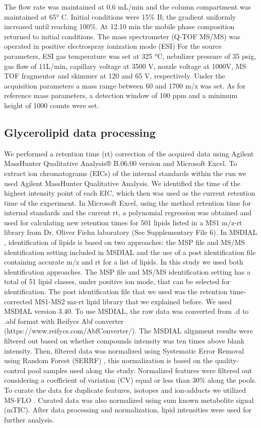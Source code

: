 \documentclass[9pt,twocolumn,twoside]{BioRxiv}
\begin{document}
The flow rate was maintained at 0.6 mL/min and the column compartment was maintained at 65° C. Initial conditions were 15\% B; the gradient uniformly increased until reaching 100\%. 
At 12.10 min the mobile phase composition returned to initial conditions.
The mass spectrometer (Q-TOF MS/MS) was operated in positive electrospray ionization mode (ESI)
For the source parameters, ESI gas temperature was set at 325 °C, nebulizer pressure of 35 psig, gas flow of 11L/min, capillary voltage at 3500 V, nozzle voltage at 1000V, MS TOF fragmentor and skimmer at 120 and 65 V, respectively.
Under the acquisition parameters a mass range between 60 and 1700 m/z was set. As for reference mass parameters, a detection window of 100 ppm and a minimum height of 1000 counts were set. 

\subsection{Glycerolipid data processing}
We performed a retention time (rt) correction of the acquired data using Agilent MassHunter Qualitative Analysis® B.06.00 version and Microsoft Excel. 
To extract ion chromatograms (EICs) of the internal standards within the run we used Agilent MassHunter Qualitative Analysis.
We identified the time of the highest intensity point of each EIC, which then was used as the current retention time of the experiment. 
In Microsoft Excel, using the method retention time for internal standards and the current rt, a polynomial regression was obtained and used for calculating new retention times for 501 lipids listed in a MS1 m/z-rt library from Dr. Oliver Fiehn laboratory (See Supplementary File 6).
In MSDIAL \cite{Tsugawa2015-kh}, identification of lipids is based on two approaches: the MSP file and MS/MS identification setting included in MSDIAL and the use of a post identification file containing accurate m/z and rt for a list of lipids. In this study we used both identification approaches. 
The MSP file and MS/MS identification setting has a total of 51 lipid classes, under positive ion mode, that can be selected for identification. 
The post identification file that we used was the retention time-corrected MS1-MS2 mz-rt lipid library that we explained before. 
We used MSDIAL \cite{Tsugawa2015-kh} version 3.40. To use MSDIAL, the raw data was converted from .d to .abf format with Reifycs Abf converter (https://www.reifycs.com/AbfConverter/). 
The MSDIAL alignment results were filtered out based on whether compounds intensity was ten times above blank intensity. 
Then, filtered data was normalized using Systematic Error Removal using Random Forest (SERRF) \cite{Fan2019}, this normalization is based on the quality-control pool samples used along the study. Normalized features were filtered out considering a coefficient of variation (CV) equal or less than 30\% along the pools. 
To curate the data for duplicate features, isotopes and ion-adducts we utilized MS-FLO \cite{DeFelice2017-ms}.
Curated data was also normalized using sum known metabolite signal (mTIC). 
After data processing and normalization, lipid intensities were used for further analysis.
\end{document}
